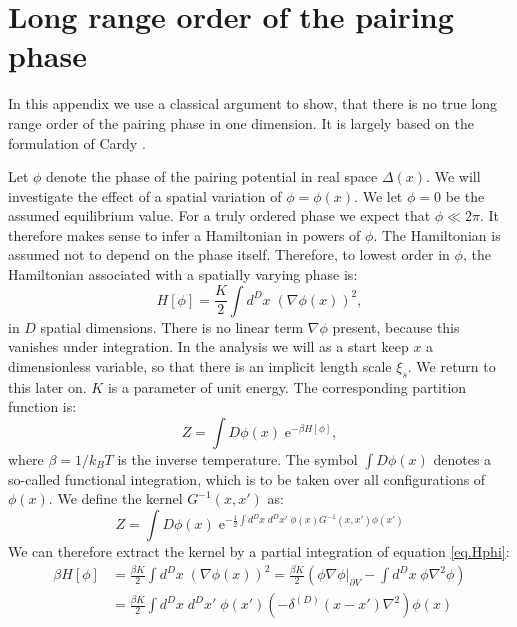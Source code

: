 
\chapter{Long range order of the pairing phase} %

\label{Appendix.longrangeorder.pairingphase} %

In this appendix we use a classical argument to show, that there is no true long range order of the pairing phase in one dimension. It is largely based on the formulation of Cardy \cite{Cardy.StatPhys}. 

Let $\phi$ denote the phase of the pairing potential in real space $\Delta(x)$. We will investigate the effect of a spatial variation of $\phi = \phi(x)$. We let $\phi = 0$ be the assumed equilibrium value. For a truly ordered phase we expect that $\phi \ll 2\pi$. It therefore makes sense to infer a Hamiltonian in powers of $\phi$. The Hamiltonian is assumed not to depend on the phase itself. Therefore, to lowest order in $\phi$, the Hamiltonian associated with a spatially varying phase is: 
\begin{equation}
H[\phi] = \frac{K}{2}\int d^{D}x \; \left(\nabla \phi(x)\right)^2, 
\label{eq.Hphi}
\end{equation}
in $D$ spatial dimensions. There is no linear term $\nabla \phi$ present, because this vanishes under integration. In the analysis we will as a start keep $x$ a dimensionless variable, so that there is an implicit length scale $\xi_s$. We return to this later on. $K$ is a parameter of unit energy. The corresponding partition function is: 
\begin{equation}
Z = \int D\phi(x) \; \text{e}^{-\beta H[\phi]}, 
\label{eq.partitionfunction}
\end{equation}
where $\beta = 1 / k_BT$ is the inverse temperature. The symbol $\int D\phi(x)$ denotes a so-called functional integration, which is to be taken over all configurations of $\phi(x)$. We define the kernel $G^{-1}(x,x')$ as: 
\begin{equation}
Z = \int D\phi(x)\; \text{e}^{-\frac{1}{2}\int d^{D}x\; d^{D}x' \; \phi(x)G^{-1}(x,x')\phi(x')} \nonumber
\end{equation}
We can therefore extract the kernel by a partial integration of equation \eqref{eq.Hphi}: 
\begin{align}
\beta H[\phi] &= \frac{\beta K}{2}\int d^{D}x \; \left(\nabla \phi(x)\right)^2 = \frac{\beta K}{2}\left( \left.\phi\nabla\phi\right|_{\partial V} - \int d^{D}x \; \phi \nabla^2\phi \right) \nonumber \\
&= \frac{\beta K}{2}\int d^{D}x\; d^{D}x'\; \phi(x')\left(-\delta^{(D)}(x - x')\nabla^2\right)\phi(x) \nonumber 
\end{align}
